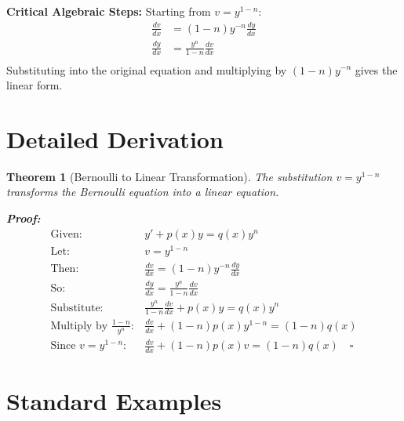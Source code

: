 \documentclass[12pt]{article}
\newtheorem{theorem}{Theorem}
\begin{document}
\begin{warning}
\textbf{Critical Algebraic Steps:}
Starting from $v = y^{1-n}$:
\begin{align}
\frac{dv}{dx} &= (1-n)y^{-n} \frac{dy}{dx} \\
\frac{dy}{dx} &= \frac{y^n}{1-n} \frac{dv}{dx} \\
\end{align}
Substituting into the original equation and multiplying by $(1-n)y^{-n}$ gives the linear form.
\end{warning}

\section{Detailed Derivation}

\begin{theorem}[Bernoulli to Linear Transformation]
The substitution $v = y^{1-n}$ transforms the Bernoulli equation into a linear equation.

\textbf{Proof:}
\begin{align}
\text{Given: } & y' + p(x)y = q(x)y^n \\
\text{Let: } & v = y^{1-n} \\
\text{Then: } & \frac{dv}{dx} = (1-n)y^{-n}\frac{dy}{dx} \\
\text{So: } & \frac{dy}{dx} = \frac{y^n}{1-n}\frac{dv}{dx} \\
\text{Substitute: } & \frac{y^n}{1-n}\frac{dv}{dx} + p(x)y = q(x)y^n \\
\text{Multiply by } \frac{1-n}{y^n}: & \frac{dv}{dx} + (1-n)p(x)y^{1-n} = (1-n)q(x) \\
\text{Since } v = y^{1-n}: & \frac{dv}{dx} + (1-n)p(x)v = (1-n)q(x) \quad \square
\end{align}
\end{theorem}

\section{Standard Examples}
\end{document}
